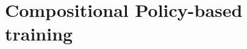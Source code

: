 \chapter{Compositional Policy-based training}
\label{chapter:appendix_compositional_policy}
\glsresetall


